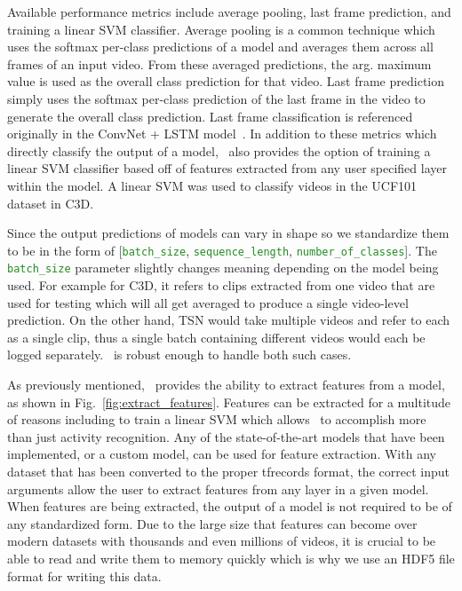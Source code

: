 \documentclass{llncs}
\begin{document}
Available performance metrics include average pooling, last frame prediction, and training a linear SVM classifier.
Average pooling is a common technique which uses the softmax per-class predictions of a model and averages them across all frames of an input video.
From these averaged predictions, the arg. maximum value is used as the overall class prediction for that video.
Last frame prediction simply uses the softmax per-class prediction of the last frame in the video to generate the overall class prediction.
Last frame classification is referenced originally in the ConvNet + LSTM model~\cite{donahue2015long}.
In addition to these metrics which directly classify the output of a model, \acro~also provides the option of training a linear SVM classifier based off of features extracted from any user specified layer within the model.
A linear SVM was used to classify videos in the UCF101 dataset in C3D.

Since the output predictions of models can vary in shape so we standardize them to be in the form of [\texttt{\textcolor{ForestGreen}{batch\_size}}, \texttt{\textcolor{ForestGreen}{sequence\_length}}, \texttt{\textcolor{ForestGreen}{number\_of\_classes}}].
The \texttt{\textcolor{ForestGreen}{batch\_size}} parameter slightly changes meaning depending on the model being used.
For example for C3D, it refers to clips extracted from one video that are used for testing which will all get averaged to produce a single video-level prediction.
On the other hand, TSN would take multiple videos and refer to each as a single clip, thus a single batch containing different videos would each be logged separately.
\acro~is robust enough to handle both such cases.

As previously mentioned, \acro~provides the ability to extract features from a model, as shown in Fig.~\ref{fig:extract_features}.
Features can be extracted for a multitude of reasons including to train a linear SVM which allows \acro~to accomplish more than just activity recognition.
Any of the state-of-the-art models that have been implemented, or a custom model, can be used for feature extraction.
With any dataset that has been converted to the proper tfrecords format, the correct input arguments allow the user to extract features from any layer in a given model.
When features are being extracted, the output of a model is not required to be of any standardized form.
Due to the large size that features can become over modern datasets with thousands and even millions of videos, it is crucial to be able to read and write them to memory quickly which is why we use an HDF5 file format for writing this data.
\end{document}
